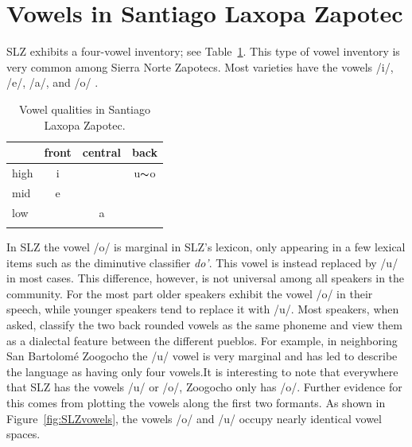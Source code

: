 \section{Vowels in Santiago Laxopa Zapotec} \label{sec:SLZ-vowels}

SLZ exhibits a four-vowel inventory; see Table~\ref{tab:SLZvowels}. This type of vowel inventory is very common among Sierra Norte Zapotecs. Most varieties have the vowels /i/, /e/, /a/, and /o/ \citep{nellisFortisLenisCajonos1980,jaegerInitialConsonantClusters1982,butlerh.DiccionarioZapotecoYatzachi1997,avelinobecerraTopicsYalalagZapotec2004,longDiccionarioZapotecoSan2005,sonnenscheinDescriptiveGrammarSan2005}. 

\begin{table}[!h]
    \centering
    \caption{Vowel qualities in Santiago Laxopa Zapotec.}
    \label{tab:SLZvowels}
    \begin{tabular}{lccc}
        \lsptoprule
        &  front& central  & back \\
        \midrule
        high   	&  i  &     &   u$\thicksim$o \\
        mid    	&  e  &   	& 	\\
        low   	&     &  a 	&	  \\
        \lspbottomrule
    \end{tabular}
\end{table}

In SLZ the vowel /o/ is marginal in SLZ's lexicon, only appearing in a few lexical items such as the diminutive classifier \textit{do'}. This vowel is instead replaced by /u/ in most cases. This difference, however, is not universal among all speakers in the community. For the most part older speakers exhibit the vowel /o/ in their speech, while younger speakers tend to replace it with /u/. Most speakers, when asked, classify the two back rounded vowels as the same phoneme and view them as a dialectal feature between the different pueblos. For example, in neighboring San Bartolomé Zoogocho the /u/ vowel is very marginal and has led \citet{sonnenscheinDescriptiveGrammarSan2005} to describe the language as having only four vowels.It is interesting to note that everywhere that SLZ has the vowels /u/ or /o/, Zoogocho only has /o/. Further evidence for this comes from plotting the vowels along the first two formants. As shown in Figure~\ref{fig:SLZvowels}, the vowels /o/ and /u/ occupy nearly identical vowel spaces.

